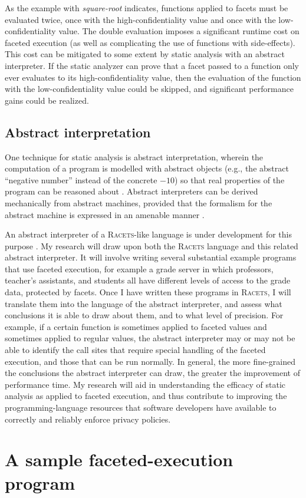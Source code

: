 \documentclass{article}
\begin{document}
As the example with \textit{square-root} indicates, functions applied to facets must be evaluated twice, once with the high-confidentiality value and once with the low-confidentiality value. The double evaluation imposes a significant runtime cost on faceted execution (as well as complicating the use of functions with side-effects). This cost can be mitigated to some extent by static analysis with an abstract interpreter. If the static analyzer can prove that a facet passed to a function only ever evaluates to its high-confidentiality value, then the evaluation of the function with the low-confidentiality value could be skipped, and significant performance gains could be realized.

\subsection{Abstract interpretation}
One technique for static analysis is abstract interpretation, wherein the computation of a program is modelled with abstract objects (e.g., the abstract ``negative number'' instead of the concrete $-10$) so that real properties of the program can be reasoned about \cite{ai-original}. Abstract interpreters can be derived mechanically from abstract machines, provided that the formalism for the abstract machine is expressed in an amenable manner \cite{aam}.

An abstract interpreter of a \textsc{Racets}-like language is under development for this purpose \cite{abstract-inter}. My research will draw upon both the \textsc{Racets} language and this related abstract interpreter. It will involve writing several substantial example programs that use faceted execution, for example a grade server in which professors, teacher's assistants, and students all have different levels of access to the grade data, protected by facets. Once I have written these programs in \textsc{Racets}, I will translate them into the language of the abstract interpreter, and assess what conclusions it is able to draw about them, and to what level of precision. For example, if a certain function is sometimes applied to faceted values and sometimes applied to regular values, the abstract interpreter may or may not be able to identify the call sites that require special handling of the faceted execution, and those that can be run normally. In general, the more fine-grained the conclusions the abstract interpreter can draw, the greater the improvement of performance time. My research will aid in understanding the efficacy of static analysis as applied to faceted execution, and thus contribute to improving the programming-language resources that software developers have available to correctly and reliably enforce privacy policies.

\section{A sample faceted-execution program}


\end{document}
